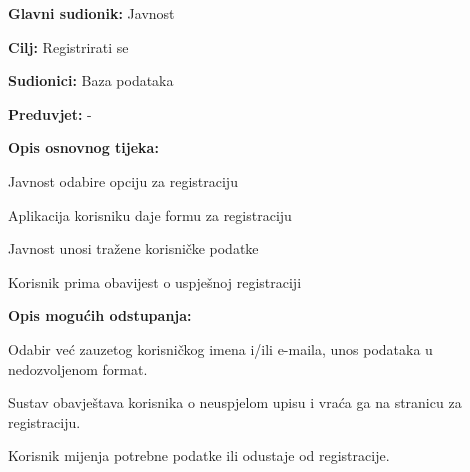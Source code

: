 				
				\noindent {}
				\begin{packed_item}
	
						\item \textbf{Glavni sudionik: }Javnost
						\item  \textbf{Cilj:} Registrirati se
						\item  \textbf{Sudionici:} Baza podataka
						\item  \textbf{Preduvjet:} -
						\item  \textbf{Opis osnovnog tijeka:}
						
						\item[] \begin{packed_enum}
	
							\item Javnost odabire opciju za registraciju
							\item Aplikacija korisniku daje formu za registraciju
							\item Javnost unosi tražene korisničke podatke
							\item Korisnik prima obavijest o uspješnoj registraciji
						\end{packed_enum}
					
					\item  \textbf{Opis mogućih odstupanja:}
						
						\item[] \begin{packed_item}
	
							\item[2.a] Odabir već zauzetog korisničkog imena i/ili e-maila, unos podataka u nedozvoljenom format.
							\item[] \begin{packed_enum}
								
								\item  Sustav obavještava korisnika o neuspjelom upisu i vraća ga na stranicu za registraciju.
								\item Korisnik mijenja potrebne podatke ili odustaje od registracije.

							\end{packed_enum}
						\end{packed_item}						
				\end{packed_item}

